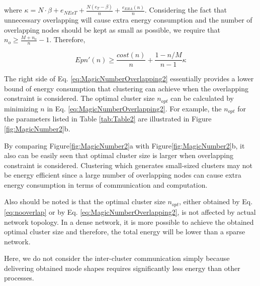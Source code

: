 where \(\kappa = N \cdot \beta + e_{NExT}+ \frac{N(e_T-\beta)}{n} + \frac{e_{ERA}(n)}{n}\).  Considering the fact that unnecessary overlapping will cause extra energy consumption and the number of overlapping nodes should be kept as small as possible, we require that \(n_o \geq \frac{M+n_o}{n} -1\). Therefore,

\begin{equation}
\label{eq:MagicNumberOverlapping2}
Epn'(n) \geq \frac{cost(n)}{n}+ \frac{1-n/M}{n-1}\kappa
\end{equation}

The right side of Eq. \ref{eq:MagicNumberOverlapping2} essentially provides a lower bound of energy consumption that clustering can achieve when the overlapping constraint is considered. The optimal cluster size \(n_{opt}\) can be calculated by minimizing \(n\) in Eq. \ref{eq:MagicNumberOverlapping2}.  For example, the \(n_{opt}\) for the parameters listed in Table \ref{tab:Table2} are illustrated in Figure \ref{fig:MagicNumber2}b. 

By comparing Figure\ref{fig:MagicNumber2}a with Figure\ref{fig:MagicNumber2}b, it also can be easily seen that optimal cluster size is larger when overlapping constraint is considered. Clustering which generates small-sized clusters may not be energy efficient since a large number of overlapping nodes can cause extra energy consumption in terms of communication and computation. 

Also should be noted is that the optimal cluster size \(n_{opt}\), either obtained by Eq. \ref{eq:nooverlap} or by Eq. \ref{eq:MagicNumberOverlapping2}, is not affected by actual network topology. In a dense network, it is more possible to achieve the obtained optimal cluster size and therefore, the total energy will be lower than a sparse network.

Here, we do not consider the inter-cluster communication simply because delivering obtained mode shapes requires significantly less energy than other processes.